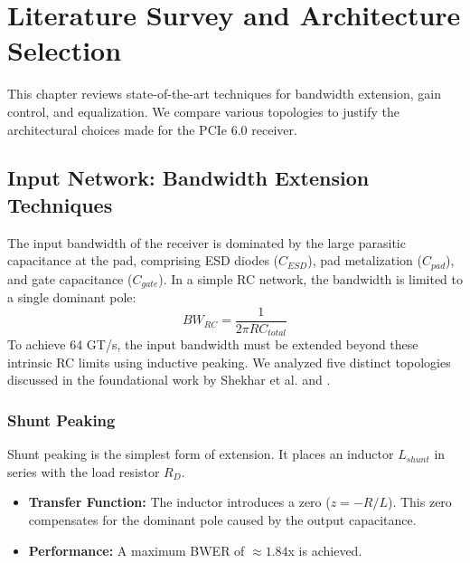 \chapter{Literature Survey and Architecture Selection}
\label{Chapter7}

This chapter reviews state-of-the-art techniques for bandwidth extension, gain control, and equalization. 
We compare various topologies to justify the architectural choices made for the PCIe 6.0 receiver.

\section{Input Network: Bandwidth Extension Techniques}

The input bandwidth of the receiver is dominated by the large parasitic capacitance at the pad, comprising ESD diodes ($C_{ESD}$), 
pad metalization ($C_{pad}$), and gate capacitance ($C_{gate}$). In a simple RC network, the bandwidth is limited to a single dominant pole:
\begin{equation}
    BW_{RC} = \frac{1}{2\pi R C_{total}}
\end{equation}
To achieve 64 GT/s, the input bandwidth must be extended beyond these intrinsic RC limits using inductive peaking. 
We analyzed five distinct topologies discussed in the foundational work by Shekhar et al. \cite{shekhar} and \cite{chen2017}.

\subsection{Shunt Peaking}
Shunt peaking is the simplest form of extension. It places an inductor $L_{shunt}$ in series with the load resistor $R_D$.
\begin{itemize}
    \item \textbf{Transfer Function:} The inductor introduces a zero ($z = -R/L$). This zero compensates for the dominant pole caused by the output capacitance.
    \item \textbf{Performance:} A maximum BWER of $\approx 1.84$x is achieved.
\end{itemize}

